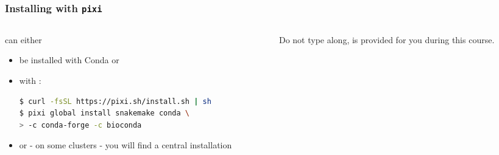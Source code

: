 \begin{frame}[fragile]
	\frametitle{Installing \Snakemake with \texttt{pixi}}
	\begin{columns}
		\begin{column}{0.65\textwidth}
			\Snakemake can either
			\begin{itemize}
				\item be installed with Conda or
				\item with :
				  \begin{lstlisting}[language=Bash, style=Shell]
$ curl -fsSL https://pixi.sh/install.sh | sh
$ pixi global install snakemake conda \
> -c conda-forge -c bioconda
				  \end{lstlisting}
				 \item or - on some clusters - you will find a central installation
			\end{itemize}
		\end{column}
		\begin{column}{0.35\textwidth}
			\begin{warning}
				Do not type along, \Snakemake is provided for you during this course. 
			\end{warning}
		\end{column}
	\end{columns}
\end{frame}

